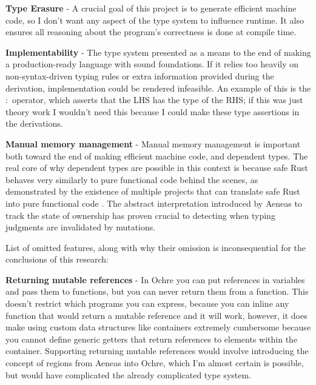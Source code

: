\documentclass[12pt,twoside]{report}
\begin{document}
\textbf{Type Erasure} - A crucial goal of this project is to generate efficient machine code, so I don't want any aspect of the type system to influence runtime. It also ensures all reasoning about the program's correctness is done at compile time.

\textbf{Implementability} - The type system presented as a means to the end of making a production-ready language with sound foundations. If it relies too heavily on non-syntax-driven typing rules or extra information provided during the derivation, implementation could be rendered infeasible. An example of this is the $:$ operator, which asserts that the LHS has the type of the RHS; if this was just theory work I wouldn't need this because I could make these type assertions in the derivations.

\textbf{Manual memory management} - Manual memory management is important both toward the end of making efficient machine code, and dependent types. The real core of why dependent types are possible in this context is because safe Rust behaves very similarly to pure functional code behind the scenes, as demonstrated by the existence of multiple projects that can translate safe Rust into pure functional code \citep{aeneas}\citep{ullrichKhaElectrolysis2024}. The abstract interpretation introduced by Aeneas to track the state of ownership has proven crucial to detecting when typing judgments are invalidated by mutations.

List of omitted features, along with why their omission is inconsequential for the conclusions of this research:

\textbf{Returning mutable references} - In Ochre you can put references in variables and pass them to functions, but you can never return them from a function. This doesn't restrict which programs you can express, because you can inline any function that would return a mutable reference and it will work, however, it does make using custom data structures like containers extremely cumbersome because you cannot define generic getters that return references to elements within the container. Supporting returning mutable references would involve introducing the concept of regions from Aeneas into Ochre, which I'm almost certain is possible, but would have complicated the already complicated type system.
\end{document}
